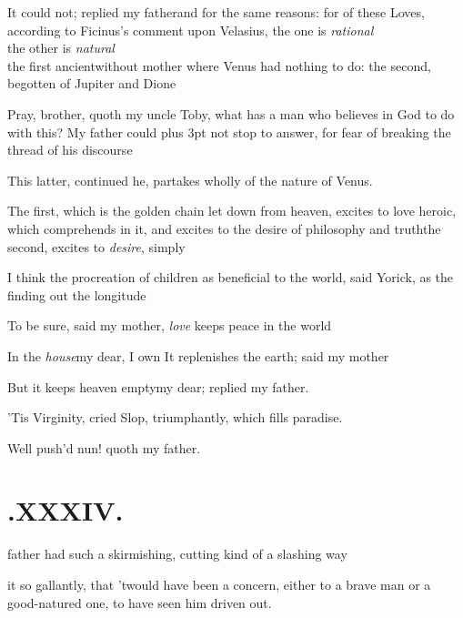 \documentclass{article}
\begin{document}
It could not; replied my father\tsk and for the same reasons:
for of these Loves, according to Ficinus’s comment
upon Velasius, the one is \textit{rational}\tsh\\
\null\quad\tsh the other is \textit{natural}\tsh \\
the first ancient\tsh without mother \tsh\break where
Venus had nothing to do: the second, begotten of
Jupiter and Dione\tsk

\tsh Pray, brother, quoth my uncle Toby, what
has a man who believes in God to do with this? My father could
\bgroup\parskip=3pt plus 3pt%
not stop to answer, for fear of breaking the
thread of his discourse\tsh

This latter, continued he, partakes wholly of
the nature of Venus.

The first, which is the golden chain let down
from heaven, excites to love heroic, which
comprehends in it, and excites to the desire of
philosophy and truth\tsh the second, excites to
\textit{desire}, simply\tsh

\tsh I think the procreation of children as beneficial
to the world, said Yorick, as the finding out the
longitude\tsh

\tsh To be sure, said my mother, \textit{love} keeps
peace in the world\tsh

\tsh In the \textit{house}\tsk my dear, I
own\tsk \break
\null\tsh It replenishes the earth; said my
mother\tsh

But it keeps heaven empty\tsk my dear; replied my father.
\egroup

\etp{}
\eject
\tsk ’Tis Virginity, cried Slop,
triumphantly, which fills paradise.

Well push’d nun! quoth my father.

\section{.\enspace XXXIV.}

 father had such a skirmishing, cutting kind of a slashing way 

\noindent
{}
 it so gallantly,
that ’twould have been a concern, either to a brave man or
a\break
good-natured one, to have seen him\break
driven out.
\end{document}
